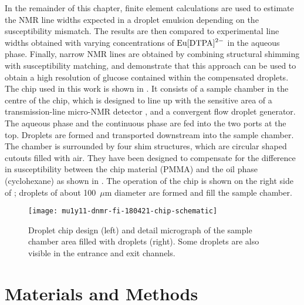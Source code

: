 In the remainder of this chapter,
finite element calculations are used to estimate
the NMR line widths expected in a droplet emulsion
depending on the susceptibility mismatch.
The results are then compared to experimental
line widths obtained with varying concentrations
of $\ce{Eu[DTPA]^{2-}}$ in the aqueous phase. Finally,
narrow NMR lines are obtained by
combining structural shimming \citep{Ryan:2014hl} with
susceptibility matching, and demonstrate that this
approach can be used to obtain a high resolution of glucose contained within the compensated droplets.
The chip used in this work is shown in . It consists of a sample
chamber in the centre of the chip, which is designed to line up with
the sensitive area of a transmission-line
micro-NMR detector \citep{Finch:2016gv}, and a convergent flow droplet
generator. The aqueous phase and the continuous
phase are fed into the two ports at the top. Droplets are
formed and transported downstream into the sample chamber.
 The chamber is surrounded by four shim structures, which are circular
 shaped cutouts filled with air. They have been designed to compensate
 for the difference in susceptibility between the chip material (PMMA)
 and the oil phase (cyclohexane) as shown in . The operation of the chip is shown
 on the right side of ; droplets of about 100~$\mu$m diameter are formed and
 fill the sample chamber.

 \begin{figure}
   \begin{center}
     \texttt{[image: mu1y11-dnmr-fi-180421-chip-schematic]}
   \end{center}
   \caption{Droplet chip design (left) and detail micrograph of the sample chamber
   area filled with droplets (right). Some droplets are also visible in the
   entrance and exit channels.}
   \label{fig:chip-design}
 \end{figure}

\section{Materials and Methods}

